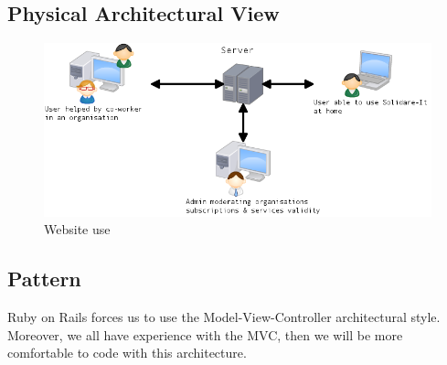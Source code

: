 \subsection{Physical Architectural View}



\begin{figure}[!ht]
	\begin{center}
		\includegraphics[width=\textwidth]{architectural_view_1.png}
		\caption{Website use}
		\label{fig:server}
	\end{center}
\end{figure}



\subsection{Pattern}

Ruby on Rails forces us to use the Model-View-Controller architectural style. Moreover, we all have experience with the MVC, then we will be more comfortable to code with this architecture.